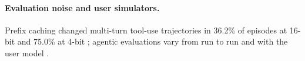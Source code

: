 \paragraph{Evaluation noise and user simulators.} Prefix caching changed multi-turn tool-use trajectories in 36.2\% of episodes at 16-bit and 75.0\% at 4-bit \citep{patodiya2026same}; agentic evaluations vary from run to run \citep{bjarnason2026randomness,chen2026noisefloor} and with the user model \citep{seshadri2026lost,jain2026userproxybench}. %


